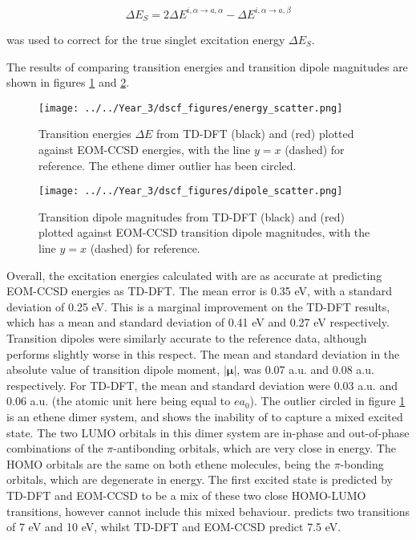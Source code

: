 \begin{equation}
\Delta E_S = 2\Delta E^{i,\alpha \rightarrow a, \alpha} - \Delta E^{i,\alpha \rightarrow a, \beta}
\end{equation}

was used to correct for the true singlet excitation energy $\Delta E_S$.

The results of comparing transition energies and transition dipole magnitudes are
shown in figures \ref{fig:energy_scatter} and \ref{fig:dipole_scatter}.

\begin{figure}
\centering
\texttt{[image: ../../Year\_3/dscf\_figures/energy\_scatter.png]}
\caption{Transition energies $\Delta E$ from TD-DFT (black) and \dscf (red)
 plotted against EOM-CCSD energies, with the line $y=x$ (dashed) for reference.
 The ethene dimer outlier has been circled.}
\label{fig:energy_scatter}
\end{figure}

\begin{figure}
\centering
\texttt{[image: ../../Year\_3/dscf\_figures/dipole\_scatter.png]}
\caption{Transition dipole magnitudes from TD-DFT (black) and \dscf (red) plotted
against EOM-CCSD transition dipole magnitudes, with the line $y=x$ (dashed) for 
reference.}
\label{fig:dipole_scatter}
\end{figure}

Overall, the excitation energies calculated with \dscf are as accurate at predicting
EOM-CCSD energies as TD-DFT. The mean error is 0.35 eV, with a standard deviation
of 0.25 eV. This is a marginal improvement on the TD-DFT results, which has a mean
and standard deviation of 0.41 eV and 0.27 eV respectively. Transition dipoles 
were similarly accurate to the reference data, although \dscf performs slightly 
worse in this respect. The mean and standard deviation in the absolute value
of transition dipole moment, $|\mathbf{\mu}|$, was 0.07 a.u. and 0.08 a.u. respectively.
For TD-DFT, the mean and standard deviation were 0.03 a.u. and 0.06 a.u. (the atomic
unit here being equal to $ea_0$).
The outlier circled in figure \ref{fig:energy_scatter} is an ethene dimer system,
and shows the inability of \dscf to capture a mixed excited state. The two LUMO
orbitals in this dimer system are in-phase and out-of-phase combinations of the 
$\pi$-antibonding orbitals, which are very close in energy. The HOMO
orbitals are the same on both ethene molecules, being the $\pi$-bonding orbitals, 
which are degenerate in energy. The first excited state is predicted by TD-DFT and
EOM-CCSD to be a mix of these two close HOMO-LUMO transitions, however \dscf cannot
include this mixed behaviour. \dscf predicts two transitions of 7 eV and 10 eV,
whilst TD-DFT and EOM-CCSD predict 7.5 eV.

